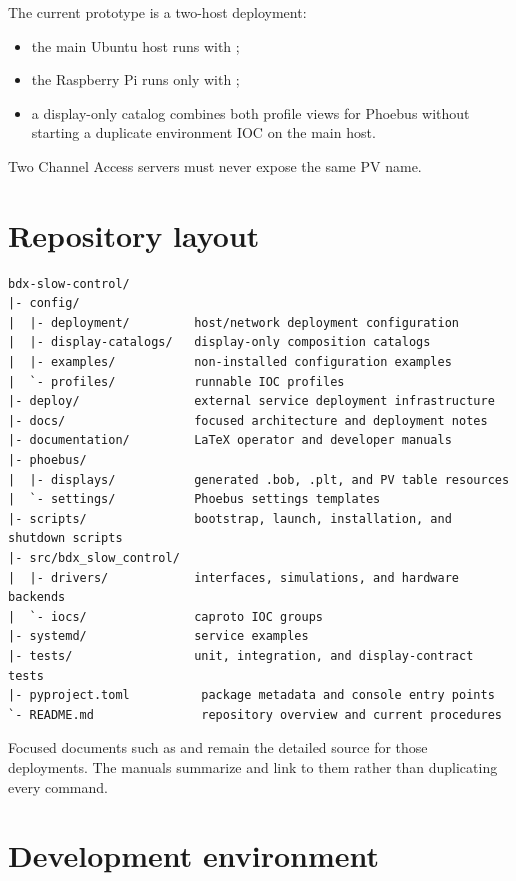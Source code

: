 The current prototype is a two-host deployment:

\begin{itemize}
  \item the main Ubuntu host runs  with ;
  \item the Raspberry Pi runs only  with ;
  \item a display-only catalog combines both profile views for Phoebus without starting a duplicate environment IOC on the main host.
\end{itemize}

Two Channel Access servers must never expose the same PV name.

\section{Repository layout}

\begin{lstlisting}
bdx-slow-control/
|- config/
|  |- deployment/         host/network deployment configuration
|  |- display-catalogs/   display-only composition catalogs
|  |- examples/           non-installed configuration examples
|  `- profiles/           runnable IOC profiles
|- deploy/                external service deployment infrastructure
|- docs/                  focused architecture and deployment notes
|- documentation/         LaTeX operator and developer manuals
|- phoebus/
|  |- displays/           generated .bob, .plt, and PV table resources
|  `- settings/           Phoebus settings templates
|- scripts/               bootstrap, launch, installation, and shutdown scripts
|- src/bdx_slow_control/
|  |- drivers/            interfaces, simulations, and hardware backends
|  `- iocs/               caproto IOC groups
|- systemd/               service examples
|- tests/                 unit, integration, and display-contract tests
|- pyproject.toml          package metadata and console entry points
`- README.md               repository overview and current procedures
\end{lstlisting}

Focused documents such as  and  remain the detailed source for those deployments. The manuals summarize and link to them rather than duplicating every command.

\section{Development environment}

